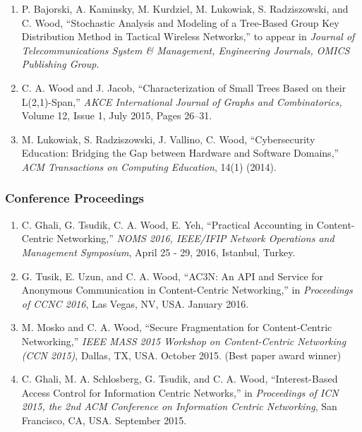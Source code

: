 \documentclass[10pt]{res} %
\begin{document}
\begin{resume}
\begin{enumerate}[J-1.]

\item P. Bajorski, A. Kaminsky, M. Kurdziel, M. Lukowiak, S. Radziszowski, and C. Wood, ``Stochastic Analysis and Modeling of a Tree-Based Group Key Distribution Method in Tactical Wireless Networks,'' to appear in {\it Journal of Telecommunications System \& Management, Engineering Journals, OMICS Publishing Group}.

\item C. A. Wood and J. Jacob, ``Characterization of Small Trees Based on their L(2,1)-Span,'' \emph{AKCE International Journal of Graphs and Combinatorics}, Volume 12, Issue 1, July 2015, Pages 26–31.

\item M. Lukowiak, S. Radziszowski, J. Vallino, C. Wood, ``Cybersecurity Education: Bridging the Gap between Hardware and Software Domains,'' {\it ACM Transactions on Computing Education}, 14(1) (2014).

\end{enumerate}
\vspace{-15pt}
\subsubsection*{Conference Proceedings}
\begin{enumerate}[C-1.]

\item C. Ghali, G. Tsudik, C. A. Wood, E. Yeh, ``Practical Accounting in Content-Centric Networking,''  \emph{NOMS 2016, IEEE/IFIP Network Operations and Management Symposium}, April 25 - 29, 2016, Istanbul, Turkey.

\item G. Tusik, E. Uzun, and C. A. Wood, ``AC3N: An API and Service for Anonymous Communication in Content-Centric Networking,'' in \emph{Proceedings of CCNC 2016}, Las Vegas, NV, USA. January 2016.

\item M. Mosko and C. A. Wood, ``Secure Fragmentation for Content-Centric Networking,'' \emph{IEEE MASS 2015 Workshop on Content-Centric Networking (CCN 2015)}, Dallas, TX, USA. October 2015. {\color{red} (Best paper award winner)}

\item C. Ghali, M. A. Schlosberg, G. Tsudik, and C. A. Wood, ``Interest-Based Access Control for Information Centric Networks,'' in \emph{Proceedings of ICN 2015, the 2nd ACM Conference on Information Centric Networking}, San Francisco, CA, USA. September 2015.


\end{enumerate}
\end{resume}
\end{document}
